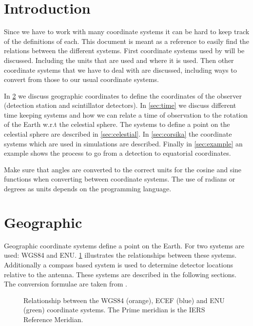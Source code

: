 \section{Introduction}

Since we have to work with many coordinate systems it can be hard to
keep track of the definitions of each. This document is meant as a
reference to easily find the relations between the different systems.
First coordinate systems used by \hisparc will be discussed. Including
the units that are used and where it is used. Then other coordinate
systems that we have to deal with are discussed, including ways to
convert from those to our usual coordinate systems.

In \cref{sec:geographic} we discuss geographic coordinates to define the
coordinates of the observer (detection station and scintillator detectors). In
\cref{sec:time} we discuss different time keeping systems and how we can
relate a time of observation to the rotation of the Earth w.r.t the celestial
sphere. The systems to define a point on the celestial sphere are described in
\cref{sec:celestial}. In \cref{sec:corsika} the coordinate systems which are
used in \corsika simulations are described. Finally in \cref{sec:example} an
example shows the process to go from a \hisparc detection to equatorial
coordinates.

Make sure that angles are converted to the correct units for the
cosine and sine functions when converting between coordinate systems.
The use of radians or degrees as units depends on the programming language.


\section{Geographic}
\label{sec:geographic}

Geographic coordinate systems define a point on the Earth. For \hisparc
two systems are used: WGS84 and ENU. \cref{fig:wgs84_ecef_enu}
illustrates the relationships between these systems. Additionally a
compass based system is used to determine detector locations relative to
the \gps antenna. These systems are described in the following sections.
The conversion formulae are taken from \cite[sec.~K]{usno:2014aa}.

\begin{figure}
    \centering
    
    \caption{Relationship between the WGS84 (orange), ECEF (blue) and ENU
             (green) coordinate systems. The Prime meridian is the IERS
             Reference Meridian.}
    \label{fig:wgs84_ecef_enu}
\end{figure}



